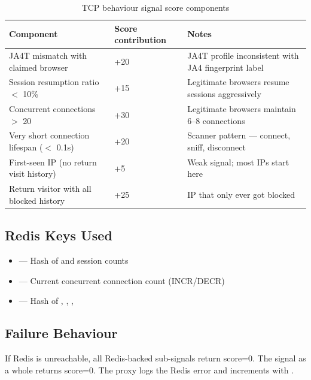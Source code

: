 \begin{fullwidth}
\begin{table}[h]
\caption{TCP behaviour signal score components}
\label{tab:tcp-scores}
\begin{tabular}{@{}llp{6.5cm}@{}}
\toprule
\textbf{Component} & \textbf{Score contribution} & \textbf{Notes} \\
\midrule
JA4T mismatch with claimed browser & +20 & JA4T profile inconsistent with JA4 fingerprint label \\
Session resumption ratio $<$ 10\% & +15 & Legitimate browsers resume sessions aggressively \\
Concurrent connections $>$ 20 & +30 & Legitimate browsers maintain 6–8 connections \\
Very short connection lifespan ($<$ 0.1s) & +20 & Scanner pattern — connect, sniff, disconnect \\
First-seen IP (no return visit history) & +5 & Weak signal; most IPs start here \\
Return visitor with all blocked history & +25 & IP that only ever got blocked \\
\bottomrule
\end{tabular}
\end{table}
\end{fullwidth}

\subsection{Redis Keys Used}

\begin{itemize}
  \item {} — Hash of  and  session counts
  \item {} — Current concurrent connection count (INCR/DECR)
  \item {} — Hash of , , , 
\end{itemize}

\subsection{Failure Behaviour}

If Redis is unreachable, all Redis-backed sub-signals return score=0. The signal as a
whole returns score=0. The proxy logs the Redis error and increments
 with .

